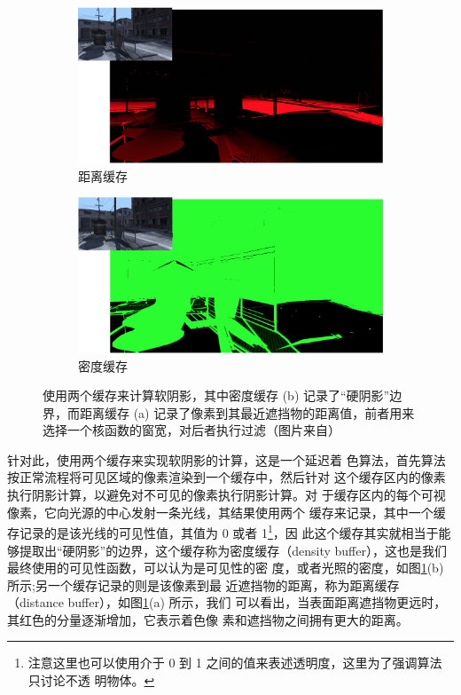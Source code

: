 \begin{figure}
\begin{fullwidth}
	\begin{subfigure}[b]{0.5\thewidth}
		\includegraphics[width=\textwidth]{figures/shadows/ray-tracing-distance-buffer}	
		\caption{距离缓存}
	\end{subfigure}
	\begin{subfigure}[b]{0.5\thewidth}
		\includegraphics[width=\textwidth]{figures/shadows/ray-tracing-density-buffer}	
		\caption{密度缓存}
	\end{subfigure}
\caption{使用两个缓存来计算软阴影，其中密度缓存 (b) 记录了“硬阴影”边界，而距离缓存 (a) 记录了像素到其最近遮挡物的距离值，前者用来选择一个核函数的窗宽，对后者执行过滤（图片来自\cite{a:Implementingfastraytracedsoftshadowsinagameengine}）}
\label{f:df-ray-tracing-buffers}
\end{fullwidth}
\end{figure}

针对此，\cite{a:Implementingfastraytracedsoftshadowsinagameengine}使用两个缓存来实现软阴影的计算，这是一个延迟着 色算法，首先算法按正常流程将可见区域的像素渲染到一个缓存中，然后针对 这个缓存区内的像素执行阴影计算，以避免对不可见的像素执行阴影计算。对 于缓存区内的每个可视像素，它向光源的中心发射一条光线，其结果使用两个 缓存来记录，其中一个缓存记录的是该光线的可见性值，其值为 0 或者 1\footnote{注意这里也可以使用介于 0 到 1 之间的值来表述透明度，这里为了强调算法只讨论不透 明物体。}，因 此这个缓存其实就相当于能够提取出“硬阴影”的边界，这个缓存称为密度缓存（density buffer），这也是我们最终使用的可见性函数，可以认为是可见性的密 度，或者光照的密度，如图\ref{f:df-ray-tracing-buffers}(b) 所示;另一个缓存记录的则是该像素到最 近遮挡物的距离，称为距离缓存（distance buffer），如图\ref{f:df-ray-tracing-buffers}(a) 所示，我们 可以看出，当表面距离遮挡物更远时，其红色的分量逐渐增加，它表示着色像 素和遮挡物之间拥有更大的距离。

